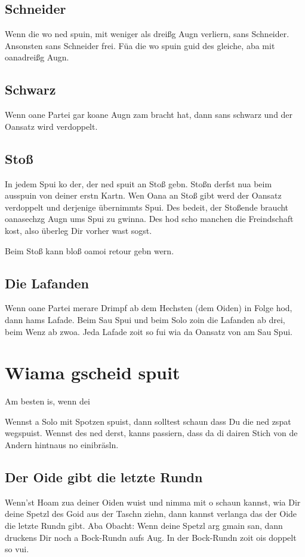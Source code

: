 \documentclass[11pt,a4paper]{scrartcl}		%
\begin{document}
	


		\subsection{Schneider}
		Wenn die wo ned spuin, mit weniger als dreißg Augn verliern, sans Schneider. Ansonsten sans Schneider frei.
		Füa die wo spuin guid des gleiche, aba mit oanadreißg Augn.





		\subsection{Schwarz}
		Wenn oane Partei gar koane Augn zam bracht hat, dann sans schwarz und der Oansatz wird verdoppelt.


		\subsection{Stoß}
		In jedem Spui ko der, der ned spuit an Stoß gebn. Stoßn derfst nua beim ausspuin von deiner erstn Kartn.
		Wen Oana an Stoß gibt werd der Oansatz verdoppelt und derjenige übernimmts Spui.
		Des bedeit, der Stoßende braucht oanasechzg Augn ums Spui zu gwinna. Des hod scho manchen die Freindschaft kost, also überleg Dir vorher wast sogst.

		Beim Stoß kann bloß oamoi retour gebn wern.


		\subsection{Die Lafanden}
		Wenn oane Partei merare Drimpf ab dem Hechsten (dem Oiden) in Folge hod, dann hams Lafade.
		Beim Sau Spui und beim Solo zoin die Lafanden ab drei, beim Wenz ab zwoa.
		Jeda Lafade zoit so fui wia da Oansatz von am Sau Spui. 




	\section{Wiama gscheid spuit}


		Am besten is, wenn dei 

	Wennst a Solo mit Spotzen spuist, dann solltest schaun dass Du die ned zspat wegspuist. Wennst des ned derst, kanns passiern, dass da di dairen Stich von de Andern hintnaus no einibräsln.



\subsection{Der Oide gibt die letzte Rundn}
Wenn'st Hoam zua deiner Oiden wuist und nimma mit o schaun kannst, wia Dir deine Spetzl des Goid aus der Taschn ziehn, dann kannst verlanga das der Oide die letzte Rundn gibt. Aba Obacht: Wenn deine Spetzl arg gmain san, dann druckens Dir noch a Bock-Rundn aufs Aug. In der Bock-Rundn zoit ois doppelt so vui.
\end{document}
